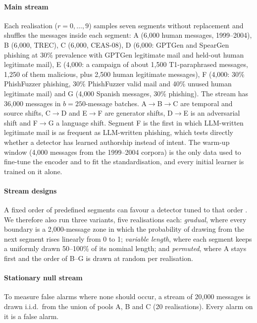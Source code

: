 \paragraph{Main stream} Each realisation ($r=0,\dots,9$) samples seven segments without replacement and shuffles the messages inside each segment: A (6{,}000 human messages, 1999--2004), B (6{,}000, TREC), C (6{,}000, CEAS-08), D (6{,}000: GPTGen and SpearGen phishing at 30\% prevalence with GPTGen legitimate mail and held-out human legitimate mail), E (4{,}000: a campaign of about 1{,}500 T1-paraphrased messages, 1{,}250 of them malicious, plus 2{,}500 human legitimate messages), F (4{,}000: 30\% PhishFuzzer phishing, 30\% PhishFuzzer valid mail and 40\% unused human legitimate mail) and G (4{,}000 Spanish messages, 30\% phishing). The stream has 36{,}000 messages in $b=250$-message batches. A$\to$B$\to$C are temporal and source shifts, C$\to$D and E$\to$F are generator shifts, D$\to$E is an adversarial shift and F$\to$G a language shift. Segment F is the first in which LLM-written legitimate mail is as frequent as LLM-written phishing, which tests directly whether a detector has learned authorship instead of intent. The warm-up window (4{,}000 messages from the 1999--2004 corpora) is the only data used to fine-tune the encoder and to fit the standardisation, and every initial learner is trained on it alone.

\paragraph{Stream designs} A fixed order of predefined segments can favour a detector tuned to that order \cite{souza2020}. We therefore also run three variants, five realisations each: \emph{gradual}, where every boundary is a 2{,}000-message zone in which the probability of drawing from the next segment rises linearly from 0 to 1; \emph{variable length}, where each segment keeps a uniformly drawn 50--100\% of its nominal length; and \emph{permuted}, where A stays first and the order of B--G is drawn at random per realisation.

\paragraph{Stationary null stream} To measure false alarms where none should occur, a stream of 20{,}000 messages is drawn i.i.d.\ from the union of pools A, B and C (20 realisations). Every alarm on it is a false alarm.

